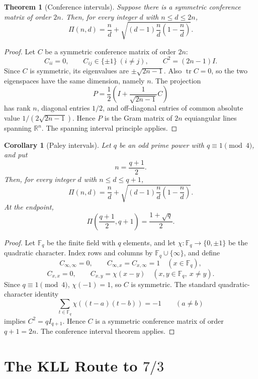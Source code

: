 \documentclass[11pt]{article}
\newtheorem{theorem}{Theorem}
\newtheorem{corollary}{Corollary}
\newcommand{\R}{\mathbb{R}}
\newcommand{\F}{\mathbb{F}}
\newcommand{\PiRel}{\Pi}
\begin{document}
\begin{theorem}[Conference intervals]
Suppose there is a symmetric conference matrix of order \(2n\).  Then, for
every integer \(d\) with \(n\le d\le2n\),
\[
  \PiRel(n,d)=
  \frac nd+\sqrt{(d-1)\frac nd\left(1-\frac nd\right)}.
\]
\end{theorem}

\begin{proof}
Let \(C\) be a symmetric conference matrix of order \(2n\):
\[
  C_{ii}=0,\qquad C_{ij}\in\{\pm1\}\ (i\ne j),\qquad C^2=(2n-1)I.
\]
Since \(C\) is symmetric, its eigenvalues are \(\pm\sqrt{2n-1}\).  Also
\(\operatorname{tr} C=0\), so the two eigenspaces have the same dimension,
namely \(n\).
The projection
\[
  P=\frac12\left(I+\frac1{\sqrt{2n-1}}C\right)
\]
has rank \(n\), diagonal entries \(1/2\), and off-diagonal entries of common
absolute value \(1/(2\sqrt{2n-1})\).  Hence \(P\) is the Gram matrix of
\(2n\) equiangular lines spanning \(\R^n\).  The spanning interval principle
applies.
\end{proof}

\begin{corollary}[Paley intervals]
Let \(q\) be an odd prime power with \(q\equiv1\pmod4\), and put
\[
  n=\frac{q+1}{2}.
\]
Then, for every integer \(d\) with \(n\le d\le q+1\),
\[
  \PiRel(n,d)=
  \frac nd+\sqrt{(d-1)\frac nd\left(1-\frac nd\right)}.
\]
At the endpoint,
\[
  \PiRel\left(\frac{q+1}{2},q+1\right)=\frac{1+\sqrt q}{2}.
\]
\end{corollary}

\begin{proof}
Let \(\F_q\) be the finite field with \(q\) elements, and let
\(\chi:\F_q\to\{0,\pm1\}\) be the quadratic character.  Index rows and
columns by \(\F_q\cup\{\infty\}\), and define
\[
  C_{\infty,\infty}=0,\qquad
  C_{\infty,x}=C_{x,\infty}=1\quad(x\in\F_q),
\]
\[
  C_{x,x}=0,\qquad
  C_{x,y}=\chi(x-y)\quad(x,y\in\F_q,\ x\ne y).
\]
Since \(q\equiv1\pmod4\), \(\chi(-1)=1\), so \(C\) is symmetric.  The
standard quadratic-character identity
\[
  \sum_{t\in\F_q}\chi((t-a)(t-b))=-1\qquad(a\ne b)
\]
implies \(C^2=qI_{q+1}\).  Hence \(C\) is a symmetric conference matrix of
order \(q+1=2n\).  The conference interval theorem applies.
\end{proof}

\section*{The KLL Route to \(7/3\)}
\end{document}
